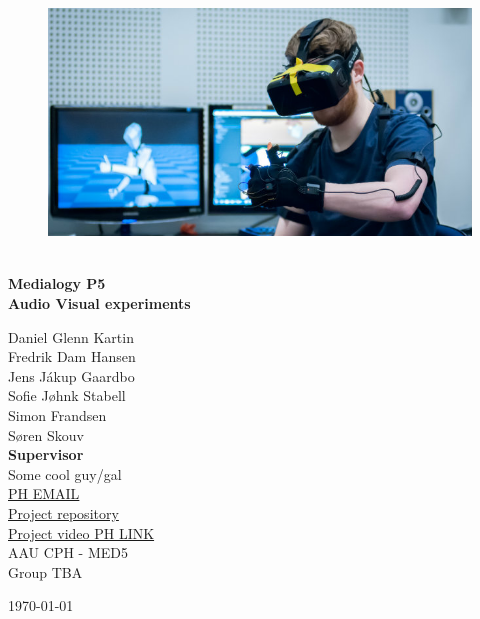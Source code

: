 \begin{titlepage}
			
\addtolength{\voffset}{2cm}

\begin{figure}[H]
\centering
\vspace{2cm}	%
\includegraphics[width=0.99\linewidth]{figure/Frontpage/frontpage.jpg}
\end{figure}

\mbox{}
\vfill
\renewcommand{\familydefault}{\sfdefault} \normalfont %
\HRule\\[0.1cm]
\textbf{{\small Medialogy P5\\ {\Huge Audio Visual experiments}}} \hspace{0.15cm}\\
\HRule\smallskip{}
\begin{multicols}{2}
{\Large Daniel Glenn Kartin\\Fredrik Dam Hansen\\Jens Jákup Gaardbo\\Sofie Jøhnk Stabell\\Simon Frandsen\\Søren Skouv\columnbreak}\\
\setlength{\parskip}{2.4cm}
{\Large{\textbf{Supervisor}\\Some cool guy/gal\\\href{mailto:PH EMAIL}{\color{blue}PH EMAIL}}}\medskip\\
\href{https://github.com/jj-gaardbo/medialogyp5code}{\color{blue}Project repository}\\
\href{https://youtu.be/lOfH0zwrcAU}{\color{blue}Project video PH LINK}\medskip
\\\small AAU CPH - 
MED5 \\
Group TBA\\
\end{multicols}
\today
\renewcommand{\familydefault}{\rmdefault} \normalfont %
\end{titlepage}


